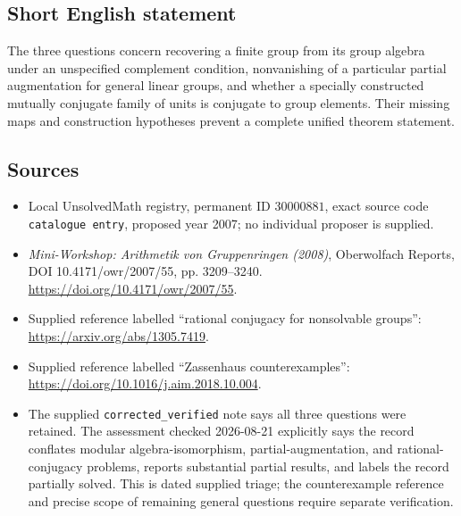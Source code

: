 \documentclass[11pt]{article}
\begin{document}
\subsection{Short English statement}
The three questions concern recovering a finite group from its group algebra under an unspecified complement condition, nonvanishing of a particular partial augmentation for general linear groups, and whether a specially constructed mutually conjugate family of units is conjugate to group elements. Their missing maps and construction hypotheses prevent a complete unified theorem statement.
\subsection{Sources}
\begin{itemize}
\item Local UnsolvedMath registry, permanent ID \(30000881\), exact source code \texttt{catalogue entry}, proposed year 2007; no individual proposer is supplied.
\item \emph{Mini-Workshop: Arithmetik von Gruppenringen (2008)}, Oberwolfach Reports, DOI 10.4171/owr/2007/55, pp. 3209--3240. \url{https://doi.org/10.4171/owr/2007/55}.
\item Supplied reference labelled ``rational conjugacy for nonsolvable groups'': \url{https://arxiv.org/abs/1305.7419}.
\item Supplied reference labelled ``Zassenhaus counterexamples'': \url{https://doi.org/10.1016/j.aim.2018.10.004}.
\item The supplied \texttt{corrected\_verified} note says all three questions were retained. The assessment checked 2026-08-21 explicitly says the record conflates modular algebra-isomorphism, partial-augmentation, and rational-conjugacy problems, reports substantial partial results, and labels the record partially solved. This is dated supplied triage; the counterexample reference and precise scope of remaining general questions require separate verification.
\end{itemize}
\end{document}
